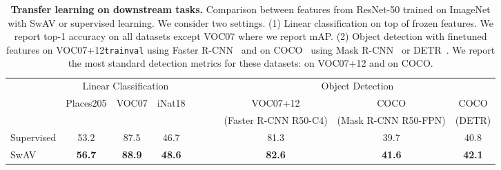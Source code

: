 \documentclass{article}
\def\OURS{SwAV\xspace}
\newcommand{\iNat}{iNat18\xspace}
\newcommand{\VOCseven}{VOC07\xspace}
\newcommand{\VOCseventwelve}{VOC07+12\xspace}
\newcommand{\Places}{Places205\xspace}
\begin{document}
\begin{table}[h]
\centering
    \caption{
\textbf{Transfer learning on downstream tasks.}
Comparison between features from ResNet-50 trained on ImageNet with \OURS or supervised learning.
We consider two settings.
(1) Linear classification on top of frozen features. We report top-1 accuracy on all datasets except \VOCseven where we report mAP.
	(2) Object detection with finetuned features on \VOCseventwelve \texttt{trainval} using Faster R-CNN~\cite{ren2015faster} and on COCO~\cite{lin2014microsoft} using Mask R-CNN~\cite{he2017mask} or DETR~\cite{carion2020end}.
We report the most standard detection metrics for these datasets:  on \VOCseventwelve and  on COCO.
    }
    \label{fig:frozen_and_detect}
    \vspace{.4em}
  \setlength{\tabcolsep}{3.7pt}
    \begin{tabular}{ @{} l ccc c ccc @{} }
      \toprule
       & \multicolumn{3}{c}{Linear Classification} &~~~~& \multicolumn{3}{c}{Object Detection}\\
\cmidrule{2-4}\cmidrule{6-8}
	    &\Places & \VOCseven & \iNat && \VOCseventwelve & COCO & COCO \\
	    & &  &  && \scriptsize(Faster R-CNN R50-C4) & \scriptsize(Mask R-CNN R50-FPN) & \scriptsize(DETR) \\
      \midrule
	    Supervised & 53.2  & 87.5 & 46.7 && 81.3 & 39.7 & 40.8 \\
\midrule
	    \OURS  & \bf 56.7 & \bf 88.9 & \bf 48.6 && \bf 82.6 & \bf 41.6 & \bf 42.1 \\
      \bottomrule
    \end{tabular}
\end{table}
\end{document}
